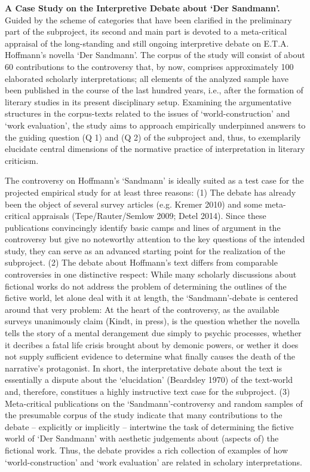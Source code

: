 \vspace{.2cm}
\noindent\textbf{A Case Study on the Interpretive Debate about `Der Sandmann'.} Guided by the scheme of categories that have been clarified in the preliminary part of the subproject, its second and main part is devoted to a meta-critical appraisal of the long-standing and still ongoing interpretive debate on E.T.A. Hoffmann's novella `Der Sandmann'. The corpus of the study will consist of about 60 contributions to the controversy that, by now, comprises approximately 100 elaborated scholarly interpretations; all elements of the analyzed sample have been published in the course of the last hundred years, i.e., after the formation of literary studies in its present disciplinary setup. Examining the argumentative structures in the corpus-texts related to the issues of `world-construction' and `work evaluation', the study aims to approach empirically underpinned answers to the guiding question (Q 1) and (Q 2) of the subproject and, thus, to exemplarily elucidate central dimensions of the normative practice of interpretation in literary criticism.

The controversy on Hoffmann's `Sandmann' is ideally suited as a test case for the projected empirical study for at least three reasons: (1) The debate has already been the object of several survey articles (e.g. Kremer 2010) and some meta-critical appraisals (Tepe/Rauter/Semlow 2009; Detel 2014). Since these publications convincingly identify basic camps and lines of argument in the controversy but give no noteworthy attention to the key questions of the intended study, they can serve as an advanced starting point for the realization of the subproject. (2) The debate about Hoffmann's text differs from comparable controversies in one distinctive respect: While many scholarly discussions about fictional works do not address the problem of determining the outlines of the fictive world, let alone deal with it at length, the `Sandmann'-debate is centered around that very problem: At the heart of the controversy, as the available surveys unanimously claim (Kindt, in press), is the question whether the novella tells the story of a mental derangement due simply to psychic processes, whether it decribes a fatal life crisis brought about by demonic powers, or wether it does not supply sufficient evidence to determine what finally causes the death of the narrative's protagonist. In short, the interpretative debate about the text is essentially a dispute about the `elucidation' (Beardsley 1970) of the text-world and, therefore, constitues a highly instructive text case for the subproject. (3) Meta-critical publications on the `Sandmann'-controversy and random samples of the presumable corpus of the study indicate that many contributions to the debate -- explicitly or implicitly -- intertwine the task of determining the fictive world of `Der Sandmann' with aesthetic judgements about (aspects of) the fictional work. Thus, the debate provides a rich collection of examples of how `world-construction' and `work evaluation' are related in scholary interpretations.
